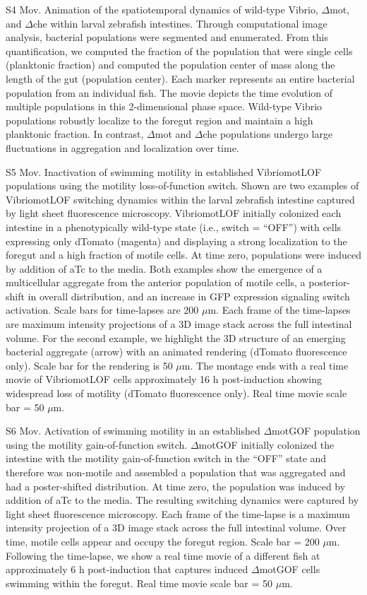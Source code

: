 S4 Mov. Animation of the spatiotemporal dynamics of wild-type Vibrio, $\Delta$mot, and $\Delta$che within larval zebrafish intestines. 
Through computational image analysis, bacterial populations were segmented and enumerated. From this quantification, we computed the fraction of the population that were single cells (planktonic fraction) and computed the population center of mass along the length of the gut (population center). Each marker represents an entire bacterial population from an individual fish. The movie depicts the time evolution of multiple populations in this 2-dimensional phase space. Wild-type Vibrio populations robustly localize to the foregut region and maintain a high planktonic fraction. In contrast, $\Delta$mot and $\Delta$che populations undergo large fluctuations in aggregation and localization over time.

S5 Mov. Inactivation of swimming motility in established VibriomotLOF populations using the motility loss-of-function switch. 
Shown are two examples of VibriomotLOF switching dynamics within the larval zebrafish intestine captured by light sheet fluorescence microscopy. VibriomotLOF initially colonized each intestine in a phenotypically wild-type state (i.e., switch = ``OFF'') with cells expressing only dTomato (magenta) and displaying a strong localization to the foregut and a high fraction of motile cells.  At time zero, populations were induced by addition of aTc to the media. Both examples show the emergence of a multicellular aggregate from the anterior population of motile cells, a posterior-shift in overall distribution, and an increase in GFP expression signaling switch activation. Scale bars for time-lapses are 200 $\mu$m. Each frame of the time-lapses are maximum intensity projections of a 3D image stack across the full intestinal volume. For the second example, we highlight the 3D structure of an emerging bacterial aggregate (arrow) with an animated rendering (dTomato fluorescence only). Scale bar for the rendering is 50 $\mu$m. The montage ends with a real time movie of VibriomotLOF cells approximately 16 h post-induction showing widespread loss of motility (dTomato fluorescence only). Real time movie scale bar = 50 $\mu$m. 

S6 Mov. Activation of swimming motility in an established $\Delta$motGOF population using the motility gain-of-function switch. 
$\Delta$motGOF initially colonized the intestine with the motility gain-of-function switch in the ``OFF'' state and therefore was non-motile and assembled a population that was aggregated and had a poster-shifted distribution. At time zero, the population was induced by addition of aTc to the media. The resulting switching dynamics were captured by light sheet fluorescence microscopy. Each frame of the time-lapse is a maximum intensity projection of a 3D image stack across the full intestinal volume. Over time, motile cells appear and occupy the foregut region. Scale bar = 200 $\mu$m. Following the time-lapse, we show a real time movie of a different fish at approximately 6 h post-induction that captures induced $\Delta$motGOF cells swimming within the foregut. Real time movie scale bar = 50 $\mu$m.


